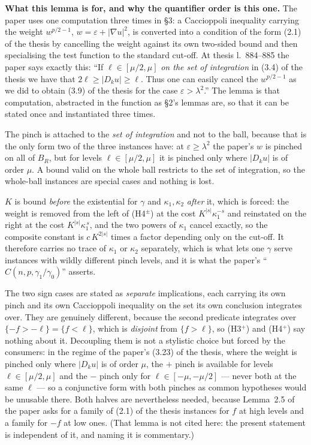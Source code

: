 \begin{lemma}
\medskip
\noindent\textbf{What this lemma is for, and why the quantifier order is this
one.}  The paper uses one computation three times in \S3: a Caccioppoli
inequality carrying the weight $w^{p/2-1}$, $w=\varepsilon+|\nabla u|^2$, is
converted into a condition of the form (2.1) of the thesis by cancelling the weight
against its own two-sided bound and then specialising the test function to the
standard cut-off.  At thesis l.~884--885 the paper says exactly this: ``If
$\ell\in[\mu/2,\mu]$ \emph{on the set of integration} in (3.4) of the thesis we have
that $2\ell\ge|D_ku|\ge\ell$.  Thus one can easily cancel the $w^{p/2-1}$ as we
did to obtain (3.9) of the thesis for the case $\varepsilon>\lambda^2$.''  The lemma
is that computation, abstracted in the function as \S2's lemmas are, so that it
can be stated once and instantiated three times.

The pinch is attached to the \emph{set of integration} and not to the ball,
because that is the only form two of the three instances have: at
$\varepsilon\ge\lambda^2$ the paper's $w$ is pinched on all of $B_R$, but for
levels $\ell\in[\mu/2,\mu]$ it is pinched only where $|D_ku|$ is of order $\mu$.
A bound valid on the whole ball restricts to the set of integration, so the
whole-ball instances are special cases and nothing is lost.

$K$ is bound \emph{before} the existential for $\gamma$ and $\kappa_1,\kappa_2$
\emph{after} it, which is forced: the weight is removed from the left of
(H4$^\pm$) at the cost $K^{|s|}\kappa_1^{-s}$ and reinstated on the right at the
cost $K^{|s|}\kappa_1^{\,s}$, and the two powers of $\kappa_1$ cancel exactly,
so the composite constant is $c\,K^{2|s|}$ times a factor depending only on the
cut-off.  It therefore carries no trace of $\kappa_1$ or $\kappa_2$ separately,
which is what lets one $\gamma$ serve instances with wildly different pinch
levels, and it is what the paper's ``$C(n,p,\gamma_1/\gamma_0)$'' asserts.

The two sign cases are stated as \emph{separate} implications, each carrying its
own pinch and its own Caccioppoli inequality on the set its own conclusion
integrates over.  They are genuinely different, because the second predicate
integrates over $\{-f>-\ell\}=\{f<\ell\}$, which is \emph{disjoint} from
$\{f>\ell\}$, so (H3$^+$) and (H4$^+$) say nothing about it.  Decoupling them is
not a stylistic choice but forced by the consumers: in the regime of the paper's
(3.23) of the thesis, where the weight is pinched only where $|D_ku|$ is of order
$\mu$, the $+$ pinch is available for levels $\ell\in[\mu/2,\mu]$ and the $-$
pinch only for $\ell\in[-\mu,-\mu/2]$ --- never both at the same $\ell$ --- so a
conjunctive form with both pinches as common hypotheses would be unusable there.
Both halves are nevertheless needed, because Lemma~2.5 of the paper asks for a
family of (2.1) of the thesis instances for $f$ at high levels and a family for $-f$
at low ones.  (That lemma is not cited here: the present statement is independent
of it, and naming it is commentary.)


\end{lemma}
